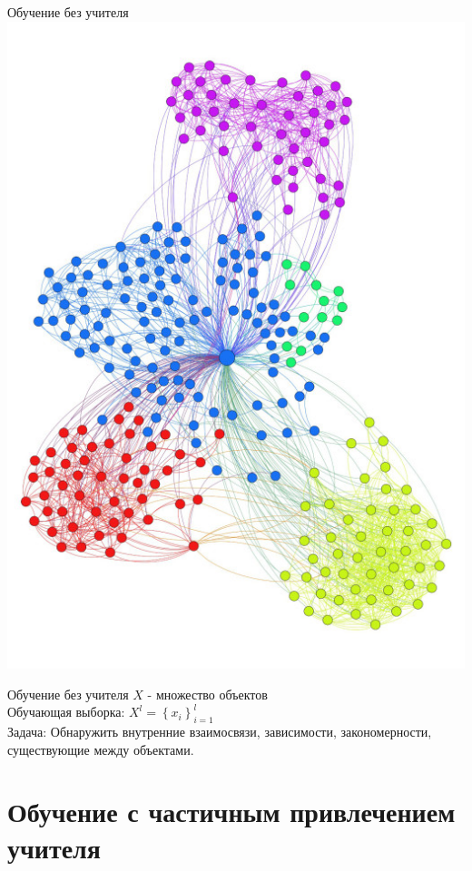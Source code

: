 \documentclass[10pt]{beamer}
\begin{document}
{
\begin{frame}{Обучение без учителя}
  \centering
  \includegraphics[width=0.9 \linewidth, height=0.9 \textheight, keepaspectratio]{images/clustering}\\
\end{frame}
}


{
\begin{frame}{Обучение без учителя}
  $X$ - множество объектов \\
	Обучающая выборка: ${X^l = \left\{x_i\right\}_{i=1}^l}$ \\ 
	\bigbreak
	\bigbreak
	\alert{Задача}: Обнаружить внутренние взаимосвязи, зависимости, закономерности, существующие между объектами.
\end{frame}
}

\section{Обучение с частичным привлечением учителя}
\end{document}

